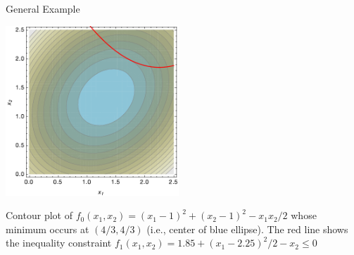 \documentclass[10pt,letterpaper,english]{beamer}
\begin{document}
\begin{frame}{General Example}

\vspace{-2mm}

  \begin{center}
    \includegraphics[width=65mm]{opt_fig}
  \end{center}

\vspace{-2mm}

Contour plot of $f_0 (x_1,x_2) = (x_1 - 1)^2 + (x_2 - 1)^2 - x_1 x_2 /2$ whose minimum occurs at $(4/3,4/3)$ (i.e., center of blue ellipse).  The red line shows the inequality constraint $f_1 (x_1,x_2)= 1.85 + (x_1 - 2.25)^2 / 2 - x_2 \leq 0$

\end{frame}
\end{document}
